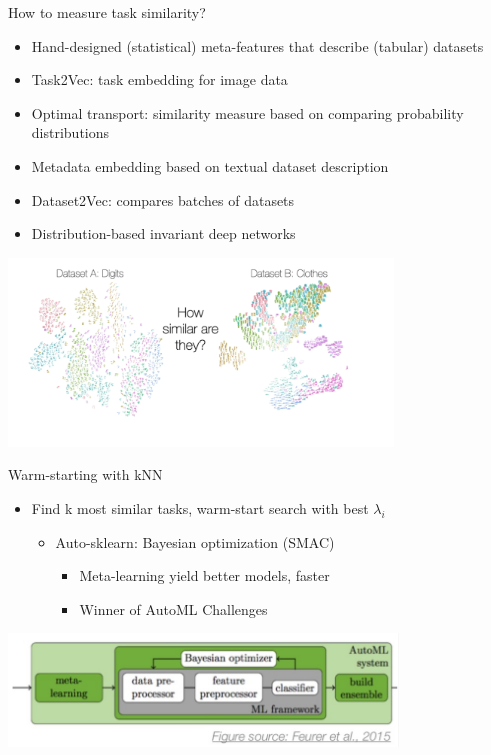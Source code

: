 \begin{frame}{How to measure task similarity?}
    \begin{itemize}
        \item Hand-designed (statistical) meta-features that describe (tabular) datasets
        \item Task2Vec: task embedding for image data
        \item Optimal transport: similarity measure based on comparing probability distributions
        \item Metadata embedding based on textual dataset description
        \item Dataset2Vec: compares batches of datasets
        \item Distribution-based invariant deep networks
    \end{itemize}
    \centering\includegraphics[height=5cm]{image/Picture1.png}
\end{frame}
\begin{frame}{Warm-starting with kNN}
    \begin{itemize}
        \item Find k most similar tasks, warm-start search with best $\lambda _i$
        \begin{itemize}
            \item Auto-sklearn: Bayesian optimization (SMAC)
            \begin{itemize}
                \item Meta-learning yield better models, faster
                \item Winner of AutoML Challenges
            \end{itemize}
        \end{itemize}
    \end{itemize}
    \centering\includegraphics[height=3cm]{image/img204247.jpg}
    
\end{frame}
